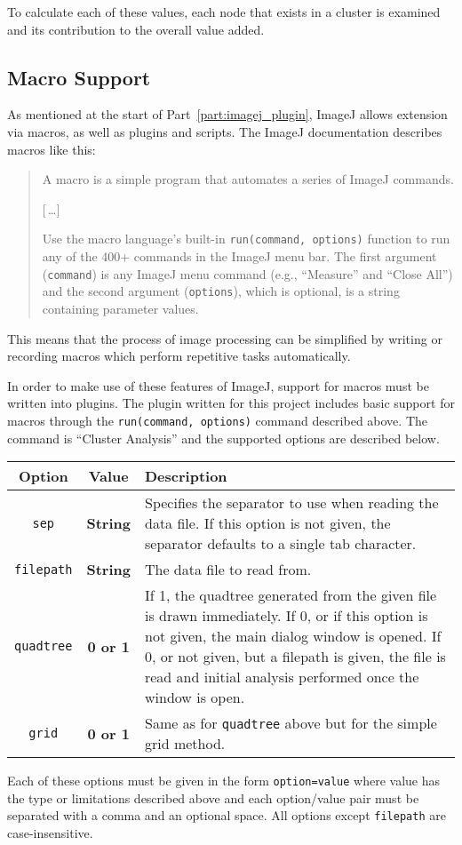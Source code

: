 To calculate each of these values, each node that exists in a cluster is
examined and its contribution to the overall value added.

\subsection{Macro Support}
\label{sub:macro_support}

As mentioned at the start of Part~\ref{part:imagej_plugin}, ImageJ allows
extension via macros, as well as plugins and scripts. The ImageJ documentation
describes macros like this:

\begin{quote}
	A macro is a simple program that automates a series of ImageJ
	commands.

	[\,\ldots]

	Use the macro language's built-in \texttt{run(command,
	options)} function to run any of the 400+ commands in the ImageJ menu
	bar.  The first argument (\texttt{command}) is any ImageJ menu command
	(e.g., ``Measure'' and ``Close All'') and the second argument
	(\texttt{options}), which is optional, is a string containing parameter
	values.
\end{quote}

This means that the process of image processing can be simplified by writing or
recording macros which perform repetitive tasks automatically.

In order to make use of these features of ImageJ, support for macros must be
written into plugins. The plugin written for this project includes basic
support for macros through the \texttt{run(command, options)} command described
above. The command is ``Cluster Analysis'' and the supported options are
described below.

\tabulinesep=1.2mm
\begin{tabu}{c c X}
	\toprule
	Option & Value & Description \\
	\midrule
	\texttt{sep} & \textbf{String} & Specifies the separator to use when
		reading the data file. If this option is not given, the separator
		defaults to a single tab character. \\
	\texttt{filepath} & \textbf{String} & The data file to read from. \\
	\texttt{quadtree} & \textbf{0 or 1} & If 1, the quadtree generated from
		the given file is drawn immediately. If 0, or if this option is not
		given, the main dialog window is opened. If 0, or not given, but a
		filepath is given, the file is read and initial analysis performed once
		the window is open. \\
	\texttt{grid} & \textbf{0 or 1} & Same as for \texttt{quadtree} above
		but for the simple grid method. \\
	\bottomrule
\end{tabu}

Each of these options must be given in the form \texttt{option=value} where
value has the type or limitations described above and each option/value pair
must be separated with a comma and an optional space. All options except
\texttt{filepath} are case-insensitive.
